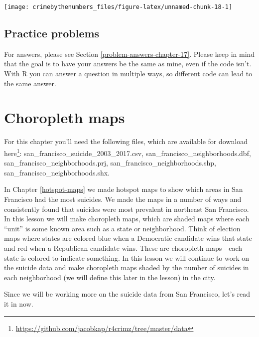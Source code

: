 \documentclass[
]{krantz}
\renewcommand{\href}[2]{#2\footnote{\url{#1}}}
\begin{document}
\begin{center}\texttt{[image: crimebythenumbers\_files/figure-latex/unnamed-chunk-18-1]} \end{center}

\hypertarget{practice-problems-10}{%
\section{Practice problems}\label{practice-problems-10}}

For answers, please see Section \ref{problem-answers-chapter-17}. Please keep in mind that the goal is to have your answers be the same as mine, even if the code isn't. With R you can answer a question in multiple ways, so different code can lead to the same answer.

\hypertarget{choropleth-maps}{%
\chapter{Choropleth maps}\label{choropleth-maps}}

For this chapter you'll need the following files, which are available for download \href{https://github.com/jacobkap/r4crimz/tree/master/data}{here}: san\_francisco\_suicide\_2003\_2017.csv, san\_francisco\_neighborhoods.dbf, san\_francisco\_neighborhoods.prj, san\_francisco\_neighborhoods.shp, san\_francisco\_neighborhoods.shx.

In Chapter \ref{hotspot-maps} we made hotspot maps to show which areas in San Francisco had the most suicides. We made the maps in a number of ways and consistently found that suicides were most prevalent in northeast San Francisco. In this lesson we will make choropleth maps, which are shaded maps where each ``unit'' is some known area such as a state or neighborhood. Think of election maps where states are colored blue when a Democratic candidate wins that state and red when a Republican candidate wins. These are choropleth maps - each state is colored to indicate something. In this lesson we will continue to work on the suicide data and make choropleth maps shaded by the number of suicides in each neighborhood (we will define this later in the lesson) in the city.

Since we will be working more on the suicide data from San Francisco, let's read it in now.
\end{document}

